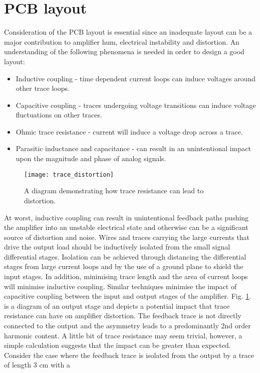 \documentclass[a4paper,10pt, oneside]{article}
\begin{document}
\section{PCB layout}
Consideration of the PCB layout is essential since an inadequate layout can be a major contribution to amplifier hum, electrical instability and distortion. An understanding of the following phenomena is needed in order to design a good layout:
\begin{itemize}
	\item Inductive coupling - time dependent current loops can induce voltages around other trace loops.
	\item Capacitive coupling - traces undergoing voltage transitions can induce voltage fluctuations on other traces.
	\item Ohmic trace resistance - current will induce a voltage drop across a trace.
	\item Parasitic inductance and capacitance - can result in an unintentional impact upon the magnitude and phase of analog signals.
\end{itemize}
\begin{figure}[H]
	\texttt{[image: trace\_distortion]}
	\caption{A diagram demonstrating how trace resistance can lead to distortion.}\label{trace}
\end{figure}
At worst, inductive coupling can result in unintentional feedback paths pushing the amplifier into an unstable electrical state and 
otherwise can be a significant source of distortion and noise. Wires and traces carrying the large currents that drive the output load 
should be inductively isolated from the small signal differential stages. Isolation can be achieved through distancing the differential 
stages from large current loops and by the use of a ground plane to shield the input stages. In addition, minimising trace length and 
the area of current loops will minimise inductive coupling. Similar techniques minimise the impact of capacitive coupling between the 
input and output stages of the amplifier. Fig. \ref{trace}. is a diagram of an output stage and depicts a potential impact that trace resistance can have on amplifier distortion. The feedback trace is not directly connected to the output and the asymmetry leads to a predominantly 2nd order harmonic content. A little bit of trace resistance may seem trivial, however, a simple calculation suggests that the impact can be greater than expected. Consider the case where the feedback trace is isolated from the output by a trace of length 3 cm with a 
\end{document}
